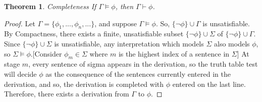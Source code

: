 \documentclass[12pt]{article}
\newtheorem{theorem}{Theorem}[section]
\theoremstyle{definition}
\theoremstyle{remark}
\begin{document}
\begin{theorem}{Completeness}
	If $\Gamma \models \phi$, then $\Gamma \vdash \phi$.
\end{theorem}

\begin{proof}
	Let $\Gamma = \{ \phi_1, ..., \phi_n, ... \}$, and suppose $\Gamma \models \phi$. So, $\{ \neg\phi \} \cup \Gamma$ is unsatisfiable. By Compactness, there exists a finite, unsatisfiable subset $\{ \neg\phi \} \cup \Sigma$ of $\{ \neg\phi \} \cup \Gamma$. Since $\{ \neg\phi \} \cup \Sigma$ is unsatisfiable, any interpretation which models $\Sigma$ also models $\phi$, so $\Sigma \models \phi$.[Consider $\phi_m \in \Sigma$ where $m$ is the highest index of a sentence in $\Sigma$] At stage $m$, every sentence of sigma appears in the derivation, so the truth table test will decide $\phi$ as the consequence of the sentences currently entered in the derivation, and so, the derivation is completed with $\phi$ entered on the last line. Therefore, there exists a derivation from $\Gamma$ to $\phi$.
\end{proof}
\end{document}
